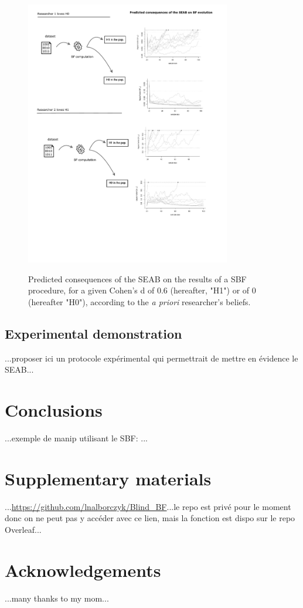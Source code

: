 \documentclass[a4paper,man,natbib,floatsintext]{apa6}
\begin{document}
\begin{figure}[H]
  \caption{Predicted consequences of the SEAB on the results of a SBF procedure, for a given Cohen's d of 0.6 (hereafter, "H1") or of 0 (hereafter "H0"), according to the \emph{a priori} researcher's beliefs.}
  \centering
  \includegraphics[width=0.8\textwidth]{figures/BFF_predictions.pdf}
  \label{fig:pred}
\end{figure}


\subsection{Experimental demonstration}

...proposer ici un protocole expérimental qui permettrait de mettre en évidence le SEAB...

\section{Conclusions}

...exemple de manip utilisant le SBF: \cite{martin_perceiving_2016}...

\section{Supplementary materials}\label{sec:supp}

...\url{https://github.com/lnalborczyk/Blind_BF}...le repo est privé pour le moment donc on ne peut pas y accéder avec ce lien, mais la fonction est dispo sur le repo Overleaf...

\section{Acknowledgements}

...many thanks to my mom...


\end{document}
